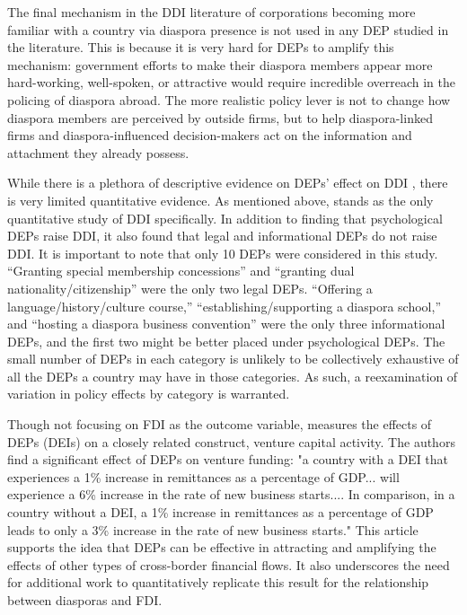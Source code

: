 \documentclass[doublespace,nopageskip]{UVAthesis}
\begin{document}
The final mechanism in the DDI literature of corporations becoming more familiar with a country via diaspora presence is not used in any DEP studied in the literature. This is because it is very hard for DEPs to amplify this mechanism: government efforts to make their diaspora members appear more hard-working, well-spoken, or attractive would require incredible overreach in the policing of diaspora abroad. The more realistic policy lever is not to change how diaspora members are perceived by outside firms, but to help diaspora-linked firms and diaspora-influenced decision-makers act on the information and attachment they already possess.

While there is a plethora of descriptive evidence on DEPs' effect on DDI \citep{okon_williams_leveraging_2026}, there is very limited quantitative evidence. As mentioned above, \citet{park_courting_2021} stands as the only quantitative study of DDI specifically. In addition to finding that psychological DEPs raise DDI, it also found that legal and informational DEPs do not raise DDI. It is important to note that only 10 DEPs were considered in this study. ``Granting special membership concessions'' and ``granting dual nationality/citizenship'' were the only two legal DEPs. ``Offering a language/history/culture course,'' ``establishing/supporting a diaspora school,'' and ``hosting a diaspora business convention'' were the only three informational DEPs, and the first two might be better placed under psychological DEPs. The small number of DEPs in each category is unlikely to be collectively exhaustive of all the DEPs a country may have in those categories. As such, a reexamination of variation in policy effects by category is warranted.

Though not focusing on FDI as the outcome variable, \citet{gamlen_human_2019} measures the effects of DEPs (DEIs) on a closely related construct, venture capital activity. The authors find a significant effect of DEPs on venture funding: "a country with a DEI that experiences a 1\% increase in remittances as a percentage of GDP... will experience a 6\% increase in the rate of new business starts.... In comparison, in a country without a DEI, a 1\% increase in remittances as a percentage of GDP leads to only a 3\% increase in the rate of new business starts." This article supports the idea that DEPs can be effective in attracting and amplifying the effects of other types of cross-border financial flows. It also underscores the need for additional work to quantitatively replicate this result for the relationship between diasporas and FDI.
\end{document}
